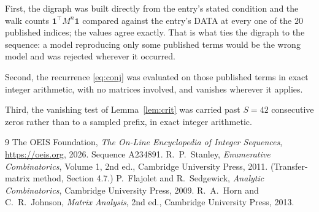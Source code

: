 \documentclass[11pt,a4paper]{article}
\theoremstyle{plain}
\theoremstyle{definition}
\begin{document}
First, the digraph was built directly from the entry's stated condition and the walk counts
$\mathbf{1}^{\!\top}M^{n}\mathbf{1}$ compared against the entry's DATA at every one of
the $20$ published indices; the values agree exactly. That is what ties the digraph to
the sequence: a model reproducing only some published terms would be the wrong model and
was rejected wherever it occurred.

Second, the recurrence \eqref{eq:conj} was evaluated on those published terms in exact
integer arithmetic, with no matrices involved, and vanishes wherever it applies.

Third, the vanishing test of Lemma~\ref{lem:crit} was carried past $S=42$ consecutive
zeros rather than to a sampled prefix, in exact integer arithmetic.

\begin{thebibliography}{9}
 The OEIS Foundation, \emph{The On-Line Encyclopedia of Integer
Sequences}, \url{https://oeis.org}, 2026. Sequence A234891.
 R.~P.~Stanley, \emph{Enumerative Combinatorics}, Volume 1, 2nd ed.,
Cambridge University Press, 2011. (Transfer-matrix method, Section 4.7.)
 P.~Flajolet and R.~Sedgewick, \emph{Analytic Combinatorics}, Cambridge
University Press, 2009.
 R.~A.~Horn and C.~R.~Johnson, \emph{Matrix Analysis}, 2nd ed., Cambridge
University Press, 2013.
\end{thebibliography}
\end{document}
